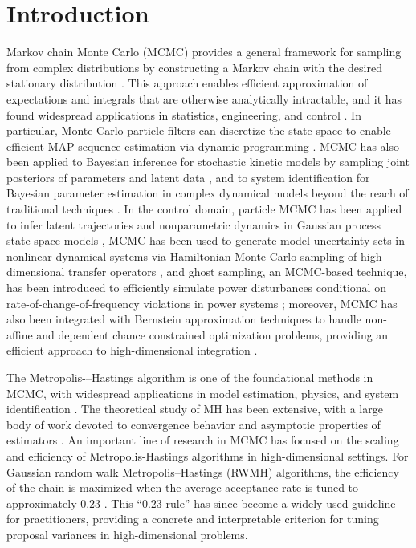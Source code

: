 \documentclass[conference]{IEEEtran}
\theoremstyle{definition}
\begin{document}
\section{Introduction}
Markov chain Monte Carlo (MCMC) provides a general framework for sampling from complex distributions by constructing a Markov chain with the desired stationary distribution \cite{Spall2003}. This approach enables efficient approximation of expectations and integrals that are otherwise analytically intractable, and it has found widespread applications in statistics, engineering, and control \cite{HillandSpall}. 
In particular, Monte Carlo particle filters can discretize the state space to enable efficient MAP sequence estimation via dynamic programming \cite{Godsill2001}. MCMC has also been applied to Bayesian inference for stochastic kinetic models by sampling joint posteriors of parameters and latent data \cite{Golightly2005}, and to system identification for Bayesian parameter estimation in complex dynamical models beyond the reach of traditional techniques \cite{Ninness2010}. 
In the control domain, particle MCMC has been applied to infer latent trajectories and nonparametric dynamics in Gaussian process state-space models \cite{Frigola2013}, MCMC has been used to generate model uncertainty sets in nonlinear dynamical systems via Hamiltonian Monte Carlo sampling of high-dimensional transfer operators \cite{Srinivasan}, and ghost sampling, an MCMC-based technique, has been introduced to efficiently simulate power disturbances conditional on rate-of-change-of-frequency violations in power systems \cite{Moriarty}; moreover, MCMC has also been integrated with Bernstein approximation techniques to handle non-affine and dependent chance constrained optimization problems, providing an efficient approach to high-dimensional integration \cite{Zhao}.



The Metropolis-–Hastings algorithm is one of the foundational methods in MCMC, with widespread applications in model estimation, physics, and system identification \cite{HillandSpall,Metropolis1953}. The theoretical study of MH has been extensive, with a large body of work devoted to convergence behavior and asymptotic properties of estimators \cite{Tierney1994, RobertsandRosenthal, BrooksandGareth1998}. 
An important line of research in MCMC has focused on the 
scaling and efficiency of Metropolis-Hastings algorithms in high-dimensional settings. For Gaussian random 
walk Metropolis--Hastings (RWMH) algorithms, the efficiency of the chain is maximized when the 
average acceptance rate is tuned to approximately $0.23$ \cite{RobertsandGelman}. This ``$0.23$ rule'' has since 
become a widely used guideline for practitioners, providing a concrete and interpretable 
criterion for tuning proposal variances in high-dimensional problems.
\end{document}
